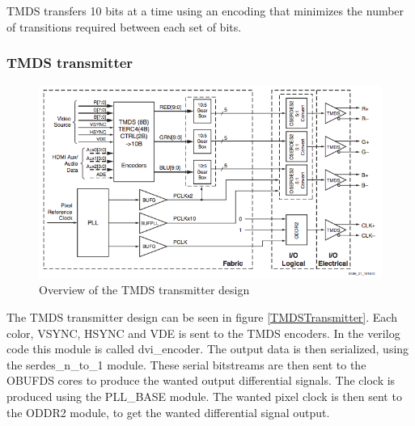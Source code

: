 TMDS transfers 10 bits at a time using an encoding that minimizes the number of transitions required between each set of bits.

\subsubsection{TMDS transmitter}
\begin{figure}[h!]
    \centering
    \includegraphics[scale= 0.7, angle = 90]{img/TMDStransmitterdesign.png}
    \caption{Overview of the TMDS transmitter design}
    \label{fig:TMDSTransmitter}
\end{figure}
The TMDS transmitter design can be seen in figure \ref{TMDSTransmitter}. Each color, VSYNC, HSYNC and VDE is sent to the TMDS encoders. In the verilog code this module is called dvi\_encoder. The output data is then serialized, using the serdes\_n\_to\_1 module. These serial bitstreams are then sent to the OBUFDS cores to produce the wanted output differential signals. The clock is produced using the PLL\_BASE module. The wanted pixel clock is then sent to the ODDR2 module, to get the wanted differential signal output.

